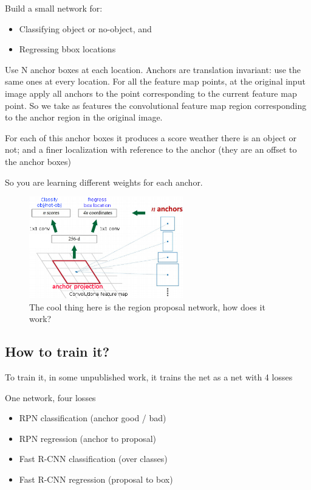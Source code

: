 Build a small network for:

\begin{itemize}
\item Classifying object or no-object, and
\item Regressing bbox locations
\end{itemize}

Use N anchor boxes at each location. Anchors are translation invariant: use the same ones at every location. For all the feature map points, at the original input image apply all anchors to the point corresponding to the current feature map point. So we take as features the convolutional feature map region corresponding to the anchor region in the original image.

For each of this anchor boxes it produces a score weather there is an object or not; and a finer localization with reference to the anchor (they are an offset to the anchor boxes)

So you are learning different weights for each anchor.

\begin{figure}[h]
  \centering
  \includegraphics[width=0.6\textwidth]{Images/region_based_cnn/11.png}
  \caption{The cool thing here is the region proposal network, how does it work?}
\end{figure}

\subsection*{How to train it?}

To train it, in some unpublished work, it trains the net as a net with 4 losses

One network, four losses
\begin{itemize}
\item RPN classification (anchor good / bad)
\item RPN regression (anchor to proposal)
\item Fast R-CNN classification (over classes)
\item Fast R-CNN regression (proposal to box)
\end{itemize}

